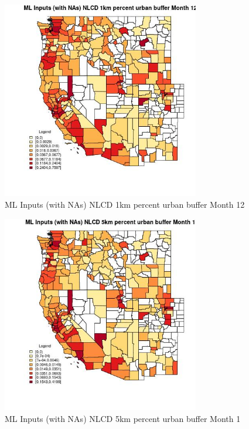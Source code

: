 \begin{figure} 
\centering  
\includegraphics[width=0.77\textwidth]{Code_Outputs/Report_ML_input_PM25_Step4_part_f_de_duplicated_aveswNAs_CountyNLCD_1km_percent_urban_buffermedianMonth12.jpg} 
\caption{\label{fig:Report_ML_input_PM25_Step4_part_f_de_duplicated_aveswNAsCountyNLCD_1km_percent_urban_buffermedianMonth12}ML Inputs (with NAs) NLCD 1km percent urban buffer Month 12} 
\end{figure} 
 

\begin{figure} 
\centering  
\includegraphics[width=0.77\textwidth]{Code_Outputs/Report_ML_input_PM25_Step4_part_f_de_duplicated_aveswNAs_CountyNLCD_5km_percent_urban_buffermedianMonth1.jpg} 
\caption{\label{fig:Report_ML_input_PM25_Step4_part_f_de_duplicated_aveswNAsCountyNLCD_5km_percent_urban_buffermedianMonth1}ML Inputs (with NAs) NLCD 5km percent urban buffer Month 1} 
\end{figure} 
 

